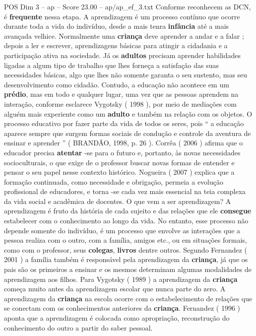 \begin{textsample}{POS Dim 3 – ap – Score 23.00 – ap/ap\_ef\_3.txt}
Conforme reconhecem as DCN, é \textbf{frequente} nessa etapa.
A aprendizagem é um processo contínuo que ocorre durante toda a vida do indivíduo, desde a mais tenra \textbf{infância} até a mais avançada velhice.
Normalmente uma \textbf{criança} deve aprender a andar e a falar ; depois a ler e escrever, aprendizagens básicas para atingir a cidadania e a participação ativa na sociedade.
Já os \textbf{adultos} precisam aprender habilidades ligadas a algum tipo de trabalho que lhes forneça a satisfação das suas necessidades básicas, algo que lhes não somente garanta o seu sustento, mas seu desenvolvimento como cidadão.
Contudo, a educação não acontece em um \textbf{prédio}, mas em todo e qualquer lugar, uma vez que as pessoas aprendem na interação, conforme esclarece Vygotsky ( 1998 ), por meio de mediações com alguém mais experiente como um \textbf{adulto} e também na relação com os objetos.
O processo educativo por fazer parte da vida de todos os seres, pois “ a educação aparece sempre que surgem formas sociais de condução e controle da aventura de ensinar e aprender ” ( BRANDÃO, 1998, p. 26 ).
Corrêa ( 2006 ) afirma que o educador precisa \textbf{atentar} -se para o futuro e, portanto, às novas necessidades socioculturais, o que exige de o professor buscar novas formas de entender e pensar o seu papel nesse contexto histórico.
Nogueira ( 2007 ) explica que a formação continuada, como necessidade e obrigação, permeia a evolução profissional de educadores, e torna -se cada vez mais essencial na teia complexa da vida social e acadêmica de docentes.
O que vem a ser aprendizagem?
A aprendizagem é fruto da história de cada sujeito e das relações que ele \textbf{consegue} estabelecer com o conhecimento ao longo da vida.
No entanto, esse processo não depende somente do indivíduo, é um processo que envolve as interações que a pessoa realiza com o outro, com a família, amigos etc., ou em situações formais, como com o professor, seus \textbf{colegas}, \textbf{livros} dentre outros.
Segundo Fernandez ( 2001 ) a família também é responsável pela aprendizagem da \textbf{criança}, já que os pais são os primeiros a ensinar e os mesmos determinam algumas modalidades de aprendizagem aos filhos.
Para Vygotsky ( 1989 ) a aprendizagem da \textbf{criança} começa muito antes da aprendizagem escolar que nunca parte do zero.
A aprendizagem da \textbf{criança} na escola ocorre com o estabelecimento de relações que se conectam com os conhecimentos anteriores da \textbf{criança}.
Fernandez ( 1996 ) aponta que a aprendizagem é colocada como apropriação, reconstrução do conhecimento do outro a partir do saber pessoal.

\end{textsample}
